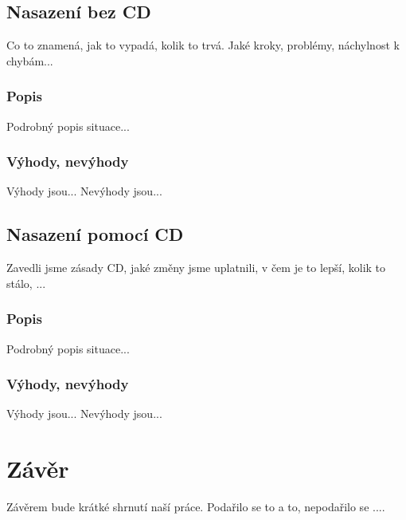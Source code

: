 \section{Nasazení bez CD}
Co to znamená, jak to vypadá, kolik to trvá. Jaké kroky, problémy, náchylnost k chybám...

\subsection{Popis}
Podrobný popis situace...

\subsection{Výhody, nevýhody}
Výhody jsou...
Nevýhody jsou...

\section{Nasazení pomocí CD}
Zavedli jsme zásady CD, jaké změny jsme uplatnili, v čem je to lepší, kolik to stálo, ...

\subsection{Popis}
Podrobný popis situace...

\subsection{Výhody, nevýhody}
Výhody jsou...
Nevýhody jsou...


\chapter{Závěr}
\label{ch:zaver}
Závěrem bude krátké shrnutí naší práce. Podařilo se to a to, nepodařilo se ....

